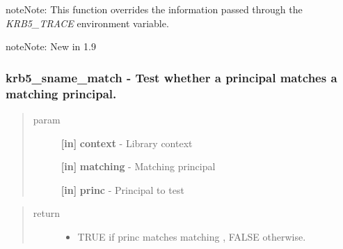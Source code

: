 \documentclass[letterpaper,10pt,english]{sphinxmanual}
\begin{document}
\begin{notice}{note}{Note:}
This function overrides the information passed through the \emph{KRB5\_TRACE} environment variable.
\end{notice}

\begin{notice}{note}{Note:}
New in 1.9
\end{notice}


\subsubsection{krb5\_sname\_match -  Test whether a principal matches a matching principal.}
\label{appdev/refs/api/krb5_sname_match::doc}\label{appdev/refs/api/krb5_sname_match:krb5-sname-match-test-whether-a-principal-matches-a-matching-principal}

\begin{fulllineitems}
\label{appdev/refs/api/krb5_sname_match:krb5_sname_match}
\end{fulllineitems}

\begin{quote}\begin{description}
\item[{param}] \leavevmode
\textbf{{[}in{]}} \textbf{context} - Library context

\textbf{{[}in{]}} \textbf{matching} - Matching principal

\textbf{{[}in{]}} \textbf{princ} - Principal to test

\end{description}\end{quote}
\begin{quote}\begin{description}
\item[{return}] \leavevmode\begin{itemize}
\item {} 
TRUE if princ matches matching , FALSE otherwise.

\end{itemize}

\end{description}\end{quote}
\end{document}
